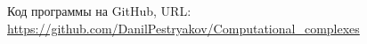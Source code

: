 \documentclass[../body.tex]{subfiles}
\begin{document}
Код программы на GitHub, URL:
\url{https://github.com/DanilPestryakov/Computational_complexes}
\end{document}
